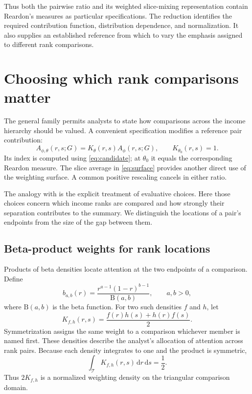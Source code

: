 \documentclass[11pt]{article}
\newcommand{\dd}{\,\mathrm{d}}
\newcommand{\T}{\mathcal{T}}
\begin{document}
Thus both the pairwise ratio and its weighted slice-mixing representation contain Reardon's measures as particular specifications. The reduction identifies the required contribution function, distribution dependence, and normalization. It also supplies an established reference from which to vary the emphasis assigned to different rank comparisons.

\section{Choosing which rank comparisons matter}
\label{sec:beta}

The general family permits analysts to state how comparisons across the income hierarchy should be valued. A convenient specification modifies a reference pair contribution:
\begin{equation}
A_{\phi,\theta}(r,s;G)=K_\theta(r,s)A_\phi(r,s;G),\qquad
K_{\theta_0}(r,s)=1.
\label{eq:multiplicative}
\end{equation}
Its index is computed using \eqref{eq:candidate}; at $\theta_0$ it equals the corresponding Reardon measure. The slice average in \eqref{eq:surface} provides another direct use of the weighting surface. A common positive rescaling cancels in either ratio.

The analogy with \citet{atkinson1970} is the explicit treatment of evaluative choices. Here those choices concern which income ranks are compared and how strongly their separation contributes to the summary. We distinguish the locations of a pair's endpoints from the size of the gap between them.

\subsection{Beta-product weights for rank locations}

Products of beta densities locate attention at the two endpoints of a comparison. Define
\begin{equation}
b_{a,b}(r)=\frac{r^{a-1}(1-r)^{b-1}}{\mathrm{B}(a,b)},
\qquad a,b>0,
\label{eq:beta-density}
\end{equation}
where $\mathrm{B}(a,b)$ is the beta function. For two such densities $f$ and $h$, let
\begin{equation}
K_{f,h}(r,s)=\frac{f(r)h(s)+h(r)f(s)}{2}.
\label{eq:beta-product}
\end{equation}
Symmetrization assigns the same weight to a comparison whichever member is named first. These densities describe the analyst's allocation of attention across rank pairs. Because each density integrates to one and the product is symmetric,
\[
\int_{\T}K_{f,h}(r,s)\dd r\dd s=\frac12.
\]
Thus $2K_{f,h}$ is a normalized weighting density on the triangular comparison domain.
\end{document}
